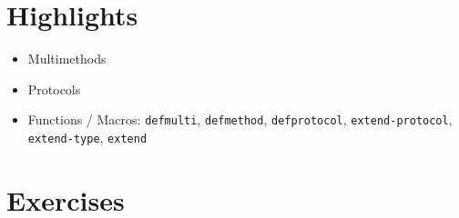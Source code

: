 \documentclass[11pt,a4paper]{article}
\begin{document}
\section{Highlights}

\begin{itemize}
    \item Multimethods
    \item Protocols
    \item Functions / Macros: \verb|defmulti|, \verb|defmethod|, \verb|defprotocol|, \verb|extend-protocol|, \verb|extend-type|, \verb|extend|
\end{itemize}



\section{Exercises}
\end{document}
